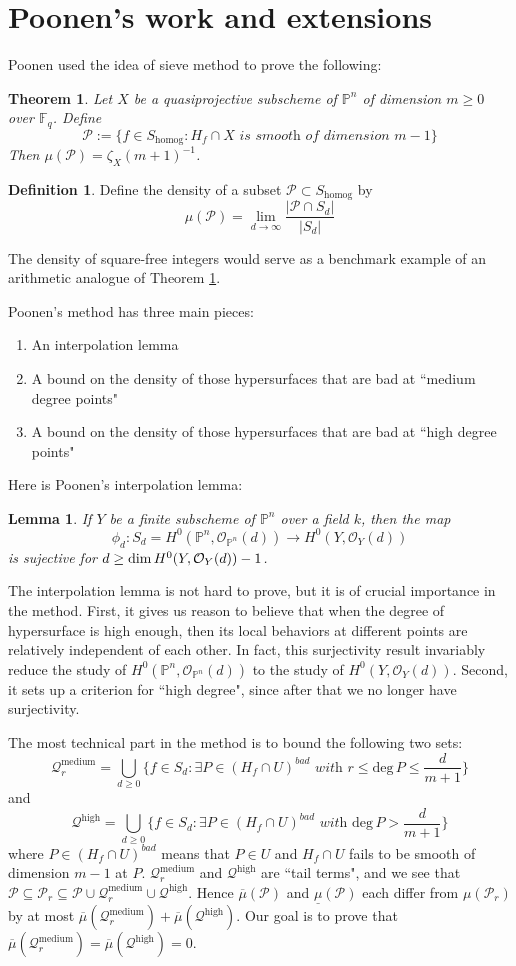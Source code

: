 \documentclass[12pt]{article}
\theoremstyle{plain}
\newtheorem{theorem}[equation]{Theorem}
\newtheorem{lemma}[equation]{Lemma}
\theoremstyle{definition}
\newtheorem{definition}[equation]{Definition}
\newcommand{\IF}{\mathbb{F}}
\newcommand{\IP}{\mathbb{P}}
\newcommand{\sO}{\mathcal{O}}
\newcommand{\sP}{\mathcal{P}}
\renewcommand{\deg}{\mathrm{deg}\,}
\renewcommand\dim{{\rm dim\,}}
\newcommand\union{\bigcup}
\newcommand{\<}{\langle}
\renewcommand{\>}{\rangle}
\newcommand{\Qmed}{\mathcal{Q}_r^\mathrm{medium}}
\newcommand{\Qhigh}{\mathcal{Q}^\mathrm{high}}
\newcommand{\uppermu}{\overline{\mu}}
\newcommand{\lowermu}{\underline{\mu}}
\begin{document}
\section{Poonen's work and extensions}
Poonen used the idea of sieve method to prove the following:
\begin{theorem}
\label{Bertini}
Let $X$ be a quasiprojective subscheme of $\IP^n$ of dimension $m \ge 0$ over $\IF_q$. Define 
$$ \sP := \{ f \in S_{\mathrm{homog}} : H_f \cap X \textit{ is smooth of dimension }m-1 \}$$
Then $\mu(\sP) = \zeta_X(m + 1)^{-1}$. 
\end{theorem}
\begin{definition}
\label{Pdef}
Define the density of a subset $\sP \subset S_\mathrm{homog}$ by
$$\mu(\sP) = \lim_{d \to \infty} \frac{|\sP \cap S_d|}{|S_d|}$$
\end{definition}
The density of square-free integers would serve as a benchmark example of an arithmetic analogue of Theorem \ref{Bertini}. 

Poonen's method has three main pieces:
\begin{enumerate}
\item An interpolation lemma
\item A bound on the density of those hypersurfaces that are bad at ``medium degree points"
\item A bound on the density of those hypersurfaces that are bad at ``high degree points"
\end{enumerate}
Here is Poonen's interpolation lemma:
\begin{lemma}
\label{surj}
If $Y$ be a finite subscheme of $\IP^n$ over a field $k$, then the map 
$$ \phi_d : S_d = H^0(\IP^n, \sO_{\IP^n}(d)) \to H^0(Y, \sO_Y(d))$$
is sujective for $d \ge \dim H^0(Y, \sO_Y(d)) - 1$. 
\end{lemma}

The interpolation lemma is not hard to prove, but it is of crucial importance in the method. First, it gives us reason to believe that when the degree of hypersurface is high enough, then its local behaviors at different points are relatively independent of each other. In fact, this surjectivity result invariably reduce the study of $H^0(\IP^n, \sO_{\IP^n}(d))$ to the study of $H^0(Y, \sO_Y(d))$. Second, it sets up a criterion for ``high degree", since after that we no longer have surjectivity. 

The most technical part in the method is to bound the following two sets: 
$$\Qmed = \union_{d \ge 0} \{ f \in S_d : \textit{$\exists P \in (H_f \cap U)^{bad}$ with } r \le \deg P \le \frac{d}{m+1}\}$$
and 
$$\Qhigh = \union_{d \ge 0} \{ f \in S_d : \exists P \in (H_f \cap U)^{bad} \textit{ with } \deg P > \frac{d}{m+1} \}$$
where $P \in (H_f \cap U)^{bad}$ means that $P \in U$ and $H_f \cap U$ fails to be smooth of dimension $m - 1$ at $P$. $\Qmed$ and $\Qhigh$ are ``tail terms", and we see that $\sP \subseteq \sP_r \subseteq \sP \cup \Qmed \cup \Qhigh$. Hence $\uppermu(\sP)$ and $\lowermu(\sP)$ each differ from $\mu(\sP_r)$ by at most $\uppermu(\Qmed) + \uppermu(\Qhigh)$. Our goal is to prove that $\uppermu(\Qmed) = \uppermu(\Qhigh) = 0$.
\end{document}
